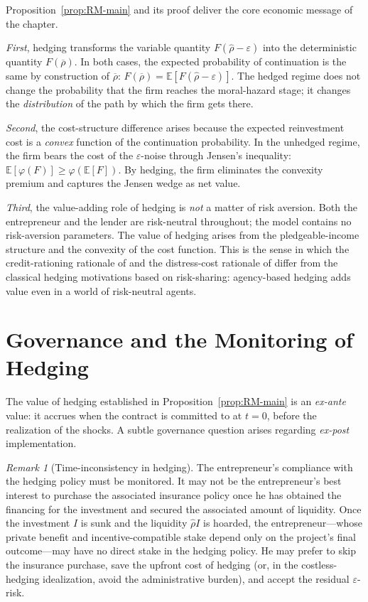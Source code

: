 \documentclass[11pt,a4paper,oneside]{book}
\def\E{\mathbb{E}}
\def\geq{\geqslant}
\theoremstyle{plain}
\theoremstyle{definition}
\theoremstyle{remark}
\newtheorem{remark}[theorem]{Remark}
\numberwithin{equation}{chapter}
\begin{document}
Proposition~\ref{prop:RM-main} and its proof deliver the core economic message of the chapter.

\emph{First}, hedging transforms the variable quantity $F(\widehat{\rho} - \varepsilon)$ into the deterministic quantity $F(\overline{\rho})$.
In both cases, the expected probability of continuation is the same by construction of $\overline{\rho}$: $F(\overline{\rho}) = \E[F(\widehat{\rho} - \varepsilon)]$.
The hedged regime does not change the probability that the firm reaches the moral-hazard stage; it changes the \emph{distribution} of the path by which the firm gets there.

\emph{Second}, the cost-structure difference arises because the expected reinvestment cost is a \emph{convex} function of the continuation probability.
In the unhedged regime, the firm bears the cost of the $\varepsilon$-noise through Jensen's inequality: $\E[\varphi(F)] \geq \varphi(\E[F])$.
By hedging, the firm eliminates the convexity premium and captures the Jensen wedge as net value.

\emph{Third}, the value-adding role of hedging is \emph{not} a matter of risk aversion.
Both the entrepreneur and the lender are risk-neutral throughout; the model contains no risk-aversion parameters.
The value of hedging arises from the pledgeable-income structure and the convexity of the cost function.
This is the sense in which the credit-rationing rationale of \citet{FrootScharfsteinStein1993} and the distress-cost rationale of \citet{Stulz1984} differ from the classical hedging motivations based on risk-sharing: agency-based hedging adds value even in a world of risk-neutral agents.

\section{Governance and the Monitoring of Hedging}
\label{sec:RM-governance}

The value of hedging established in Proposition~\ref{prop:RM-main} is an \emph{ex-ante} value: it accrues when the contract is committed to at $t=0$, before the realization of the shocks.
A subtle governance question arises regarding \emph{ex-post} implementation.

\begin{remark}[Time-inconsistency in hedging]\label{rem:RM-hedging-monitoring}
The entrepreneur's compliance with the hedging policy must be monitored.
It may not be the entrepreneur's best interest to purchase the associated insurance policy once he has obtained the financing for the investment and secured the associated amount of liquidity.
Once the investment $I$ is sunk and the liquidity $\widehat{\rho} I$ is hoarded, the entrepreneur---whose private benefit and incentive-compatible stake depend only on the project's final outcome---may have no direct stake in the hedging policy.
He may prefer to skip the insurance purchase, save the upfront cost of hedging (or, in the costless-hedging idealization, avoid the administrative burden), and accept the residual $\varepsilon$-risk.
\end{remark}
\end{document}
